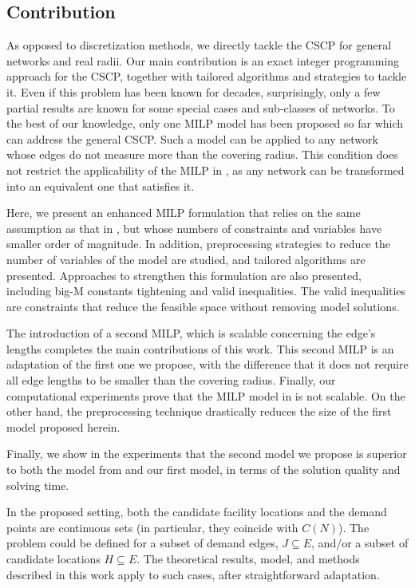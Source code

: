 \subsection{Contribution}
As opposed to discretization methods, we directly tackle the CSCP for general networks and real radii.
Our main contribution is an exact integer programming approach for the CSCP, together with tailored algorithms and strategies to tackle it. Even if this problem has been known for decades, surprisingly, only a few partial results are known for some special cases and sub-classes of networks. To the best of our knowledge, only one MILP model \cite{Hamacher20} has been proposed so far which can address the general CSCP. Such a model can be applied to any network whose edges do not measure more than the covering radius. This condition does not restrict the applicability of the MILP in \cite{Hamacher20}, as any network can be transformed into an equivalent one that satisfies it.

Here, we present an enhanced MILP formulation that relies on the same assumption as that in \cite{Hamacher20}, but whose numbers of constraints and variables have smaller order of magnitude. In addition, preprocessing strategies to reduce the number of variables of the model are studied, and tailored algorithms are presented. Approaches to strengthen this formulation are also presented, including big-M constants tightening and valid inequalities. The valid inequalities are constraints that reduce the feasible space without removing model solutions.

The introduction of a second MILP, which is scalable concerning the edge's lengths completes the main contributions of this work. This second MILP is an adaptation of the first one we propose, with the difference that it does not require all edge lengths to be smaller than the covering radius. Finally, our computational experiments prove that the MILP model in \cite{Hamacher20}  is not scalable. On the other hand, the preprocessing technique drastically reduces the size of the first model proposed herein.

Finally, we show in the experiments that the second model we propose is superior to both  the model from \cite{Hamacher20} and our first model, in terms of the solution quality and solving time.

In the proposed setting, both the candidate facility locations and the demand points are continuous sets (in particular, they coincide with $C(N)$). The problem could be defined for a subset of demand edges, $J\subseteq E$, and/or a subset of candidate locations $H\subseteq E$. The theoretical results, model, and methods described in this work apply to such cases, after straightforward adaptation.


